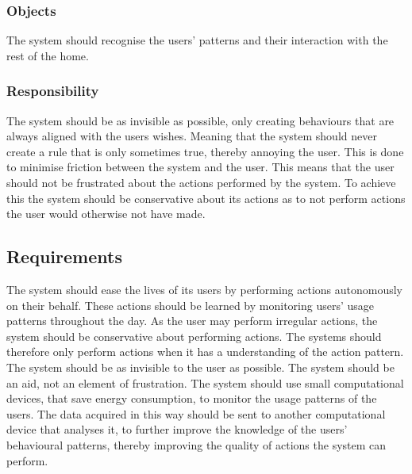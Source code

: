 \subsubsection{Objects}

The system should recognise the users' patterns and their interaction with the
rest of the home.

\subsubsection{Responsibility}

The system should be as invisible as possible, only creating behaviours that are always aligned with the users wishes. Meaning that the system should never create a rule that is only sometimes true, thereby annoying the user. This is done to minimise friction between the system and the user. This means that the user should not be frustrated about the actions performed by the system. To achieve this the system should be conservative about its actions as to not perform actions the user would otherwise not have made.

\subsection{Requirements}

The system should ease the lives of its users by performing actions autonomously
on their behalf. These actions should be learned by monitoring users' usage
patterns throughout the day. As the user may perform irregular actions, the
system should be conservative about performing actions. The systems should
therefore only perform actions when it has a understanding of the action
pattern. The system should be as invisible to the user as possible. The system
should be an aid, not an element of frustration. The system should use small
computational devices, that save energy consumption, to monitor the usage
patterns of the users. The data acquired in this way should be sent to another
computational device that analyses it, to further improve the knowledge of the
users' behavioural patterns, thereby improving the quality of actions the system can perform.
